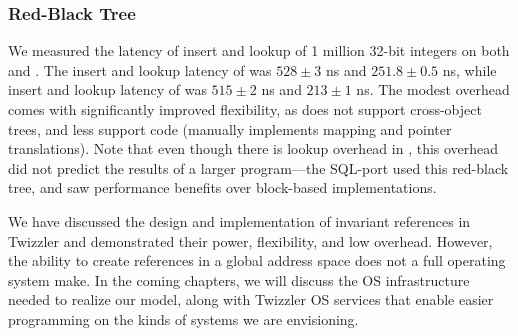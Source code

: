 \subsubsection{Red-Black Tree} We measured the latency of insert and lookup of 1 million 32-bit
integers on both \unixrbt and \nvrbt. The insert and lookup latency of \nvrbt was $528 \pm 3$ ns
and $251.8 \pm 0.5$ ns, while insert and lookup latency of \unixrbt was $515 \pm 2$ ns
and $213 \pm 1$ ns.
The modest overhead comes with significantly improved flexibility, as \unixrbt does not support
cross-object trees, and less support code (\unixrbt manually implements mapping and pointer
translations). Note that even though there is lookup overhead in
\nvrbt, this overhead did not predict the results of a larger program---the SQL-\Twizzler port used
this red-black tree, and saw performance benefits over block-based implementations.


\begin{chconc}
    We have discussed the design and implementation of invariant references in Twizzler and demonstrated their power, flexibility, and low overhead. However, the ability to create references in
    a global address space does not a full operating system make. In the coming chapters, we will discuss the OS infrastructure needed to realize our model, along with Twizzler OS services that
    enable easier programming on the kinds of systems we are envisioning.
\end{chconc}